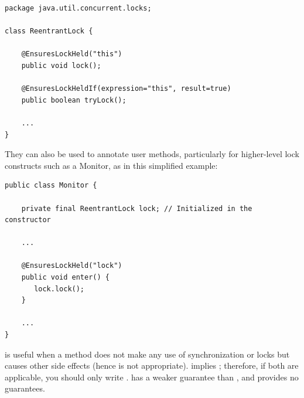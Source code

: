 \begin{Verbatim}
package java.util.concurrent.locks;

class ReentrantLock {

    @EnsuresLockHeld("this")
    public void lock();

    @EnsuresLockHeldIf(expression="this", result=true)
    public boolean tryLock();

    ...
}
\end{Verbatim}

They can also be used to annotate user methods, particularly for
higher-level lock constructs such as a Monitor, as in this simplified example:

\begin{Verbatim}
public class Monitor {

    private final ReentrantLock lock; // Initialized in the constructor

    ...

    @EnsuresLockHeld("lock")
    public void enter() {
       lock.lock();
    }

    ...
}
\end{Verbatim}


 is useful when a method does not make any use of synchronization
or locks but causes other side effects (hence  is not appropriate).
 implies ; therefore, if both are applicable,
you should only write .  has a weaker guarantee
than , and  provides no guarantees.


